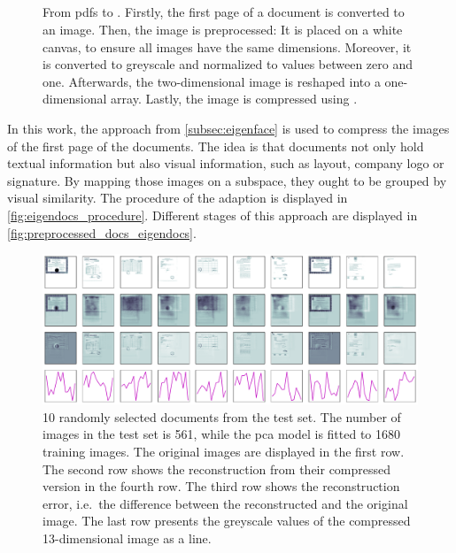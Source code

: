 \subsection{\eigendocs{}}\label{subsubsec:eigendocs}

\begin{figure}[!htb] %
    \centering
    
    \caption[\eigendocs{} procedure]{From \acp{pdf} to \eigendocs{}.
    Firstly, the first page of a document is converted to an image.
    Then, the image is preprocessed:
    It is placed on a white canvas, to ensure all images have the same dimensions.
    Moreover, it is converted to greyscale and normalized to values between zero and one.
    Afterwards, the two-dimensional image is reshaped into a one-dimensional array.
    Lastly, the image is compressed using \eigendocs{}.
    }
    \label{fig:eigendocs_procedure}
\end{figure}

In this work, the \eigenfaces{} approach from \autoref{subsec:eigenface} is used to compress the images of the first page of the documents.
The idea is that documents not only hold textual information but also visual information, such as layout, company logo or signature.
By mapping those images on a subspace, they ought to be grouped by visual similarity.
The procedure of the \eigenfaces{} adaption \textit{\eigendocs{}} is displayed in \autoref{fig:eigendocs_procedure}.
Different stages of this approach are displayed in \autoref{fig:preprocessed_docs_eigendocs}.

\begin{figure}[!htb] %
    \centering
    \includegraphics[width=1\textwidth]{images/Eigendocs/transformation/eigendocs.pdf}
    \caption[Preprocessing 10 randomly selected documents from the test set]{10 randomly selected documents from the test set.
    The number of images in the test set is 561, while the \ac{pca} model is fitted to 1680 training images.
    The original images are displayed in the first row.
    The second row shows the reconstruction from their compressed version in the fourth row.
    The third row shows the reconstruction error, i.e.\ the difference between the reconstructed and the original image.
    The last row presents the greyscale values of the compressed 13-dimensional image as a line.
    }
    \label{fig:preprocessed_docs_eigendocs}
\end{figure}


